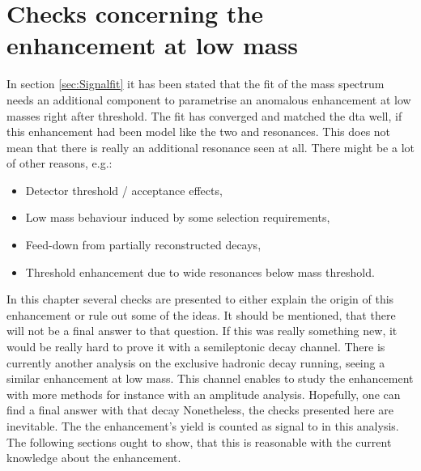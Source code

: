 \chapter{Checks concerning the enhancement at low \Dz\proton mass}
\label{sec:Structure}

In section \ref{sec:Signalfit} it has been stated that the fit of the \Dz\proton mass spectrum needs an additional component to parametrise an anomalous enhancement at low \Dz\proton masses right after threshold.
The fit has converged and matched the dta well, if this enhancement had been model like the two \LcResI and \LcResII resonances.
This does not mean that there is really an additional resonance seen at all.
There might be a lot of other reasons, e.g.:
\begin{itemize}
    \item Detector threshold / acceptance effects,
    \item Low mass behaviour induced by some selection requirements,
    \item Feed-down from partially reconstructed decays,
    \item Threshold enhancement due to wide resonances below \Dz\proton mass threshold.
\end{itemize}
In this chapter several checks are presented to either explain the origin of this enhancement or rule out some of the ideas.
It should be mentioned, that there will not be a final answer to that question.
If this was really something new, it would be really hard to prove it with a semileptonic decay channel.
There is currently another \lhcb analysis on the exclusive hadronic decay \decay{\Lb}{\Dz\proton\pim} running, seeing a similar enhancement at low \Dz\proton mass.
This channel enables to study the enhancement with more methods for instance with an amplitude analysis. 
Hopefully, one can find a final answer with that decay
Nonetheless, the checks presented here are inevitable.
The the enhancement's yield is counted as signal to \NDp in this analysis.
The following sections ought to show, that this is reasonable with the current knowledge about the enhancement.

